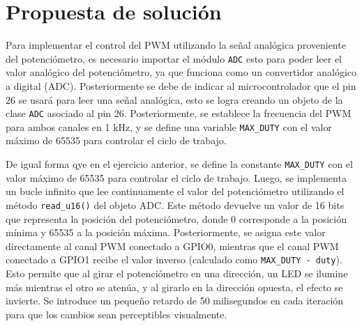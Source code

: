 \documentclass[letterpaper,12pt]{article}
\begin{document}
    \section*{Propuesta de solución}

    Para implementar el control del PWM utilizando la señal analógica proveniente del potenciómetro, es necesario importar el módulo \texttt{ADC} esto para poder leer el valor analógico del potenciómetro, ya que funciona como un convertidor analógico a digital (ADC). Posteriormente se debe de indicar al microcontrolador que el pin 26 se usará para leer una señal analógica, esto se logra creando un objeto de la clase \texttt{ADC} asociado al pin 26. Posteriormente, se establece la frecuencia del PWM para ambos canales en 1 kHz, y se define una variable \texttt{MAX\_DUTY} con el valor máximo de 65535 para controlar el ciclo de trabajo.

    De igual forma qye en el ejercicio anterior, se define la constante \texttt{MAX\_DUTY} con el valor máximo de 65535 para controlar el ciclo de trabajo. Luego, se implementa un bucle infinito que lee continuamente el valor del potenciómetro utilizando el método \texttt{read\_u16()} del objeto ADC. Este método devuelve un valor de 16 bits que representa la posición del potenciómetro, donde 0 corresponde a la posición mínima y 65535 a la posición máxima. Posteriormente, se asigna este valor directamente al canal PWM conectado a GPIO0, mientras que el canal PWM conectado a GPIO1 recibe el valor inverso (calculado como \texttt{MAX\_DUTY - duty}). Esto permite que al girar el potenciómetro en una dirección, un LED se ilumine más mientras el otro se atenúa, y al girarlo en la dirección opuesta, el efecto se invierte. Se introduce un pequeño retardo de 50 milisegundos en cada iteración para que los cambios sean perceptibles visualmente.
     
\end{document}
